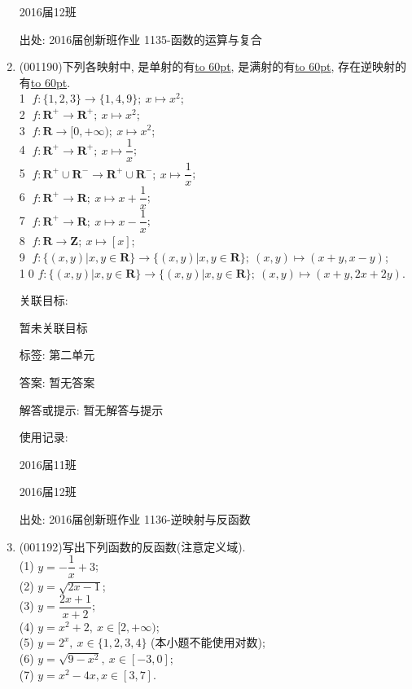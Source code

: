 \documentclass[10pt,a4paper]{article}
\newcommand{\blank}[1]{\underline{\hbox to #1pt{}}}
\begin{document}
\begin{enumerate}[1.]
2016届12班			


出处: 2016届创新班作业	1135-函数的运算与复合
\item { (001190)}下列各映射中, 是单射的有\blank{60}, 是满射的有\blank{60}, 存在逆映射的有\blank{60}.\\ 
\textcircled{1} $f: \{1,2,3\}\rightarrow \{1,4,9\}; \ x\mapsto x^2$;\\ 
\textcircled{2} $f: \mathbf{R}^+\rightarrow \mathbf{R}^+; \ x \mapsto x^2$;\\ 
\textcircled{3} $f: \mathbf{R}\rightarrow [0,+\infty); \ x \mapsto x^2$;\\ 
\textcircled{4} $f: \mathbf{R}^+\rightarrow \mathbf{R}^+; \ x \mapsto \dfrac{1}{x}$;\\ 
\textcircled{5} $f: \mathbf{R}^+\cup \mathbf{R}^-\rightarrow \mathbf{R}^+\cup \mathbf{R}^-; \ x \mapsto \dfrac{1}{x}$;\\ 
\textcircled{6} $f: \mathbf{R}^+\rightarrow \mathbf{R}; \ x \mapsto x+\dfrac{1}{x}$;\\ 
\textcircled{7} $f: \mathbf{R}^+\rightarrow \mathbf{R}; \ x \mapsto x-\dfrac{1}{x}$;\\ 
\textcircled{8} $f: \mathbf{R}\rightarrow \mathbf{Z}; \ x \mapsto [x]$;\\ 
\textcircled{9} $f: \{(x,y)|x,y\in \mathbf{R}\}\rightarrow \{(x,y)|x,y\in \mathbf{R}\};\ (x,y)\mapsto (x+y,x-y)$;\\ 
\textcircled{10} $f: \{(x,y)|x,y\in \mathbf{R}\}\rightarrow \{(x,y)|x,y\in \mathbf{R}\};\ (x,y)\mapsto (x+y,2x+2y)$.


关联目标:

暂未关联目标



标签: 第二单元

答案: 暂无答案

解答或提示: 暂无解答与提示

使用记录:

2016届11班	

2016届12班	


出处: 2016届创新班作业	1136-逆映射与反函数
\item { (001192)}写出下列函数的反函数(注意定义域).\\ 
(1) $y=-\dfrac{1}{x}+3$;\\ 
(2) $y=\sqrt{2x-1}$;\\ 
(3) $y=\dfrac{2x+1}{x+2}$;\\ 
(4) $y=x^2+2, \ x\in [2,+\infty)$;\\ 
(5) $y=2^x, \ x\in \{1,2,3,4\}$ (本小题不能使用对数);\\ 
(6) $y=\sqrt{9-x^2}, \ x\in [-3,0]$;\\ 
(7) $y=x^2-4x, x \in [3,7]$.



\end{enumerate}
\end{document}
